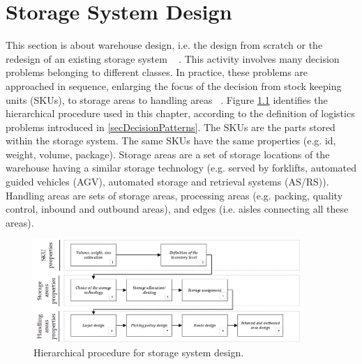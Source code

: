 \chapter{Storage System Design} \label{chapWhDesign}

This section is about warehouse design, i.e. the design from scratch or the redesign of an existing storage system ~\cite{Ashayeri1985, VanGils2017b} . This activity involves many decision problems belonging to different classes. In practice, these problems are approached in sequence, enlarging the focus of the decision from stock keeping units (SKUs), to storage areas to handling areas ~\cite{Accorsi2012, Baker2009, Dotoli2015, Park1989, Tufano2019,Yoon1996}. Figure \ref{fig_warehouse_design} identifies the hierarchical procedure used in this chapter, according to the definition of logistics problems introduced in \ref{secDecisionPatterns}. The SKUs are the parts stored within the storage system. The same SKUs have the same properties (e.g. id, weight, volume, package). Storage areas are a set of storage locations of the warehouse having a similar storage technology (e.g. served by forklifts, automated guided vehicles (AGV), automated storage and retrieval systems (AS/RS)). Handling areas are sets of storage areas, processing areas (e.g. packing, quality control, inbound and outbound areas), and edges (i.e. aisles connecting all these areas).

\begin{figure}[hbt!]
\centering
\includegraphics[width=0.9\textwidth]{SectionWarehouses/design_figures/fig_warehouse_design.png}
\captionsetup{type=figure}
\caption{Hierarchical procedure for storage system design.}
\label{fig_warehouse_design}
\end{figure}


